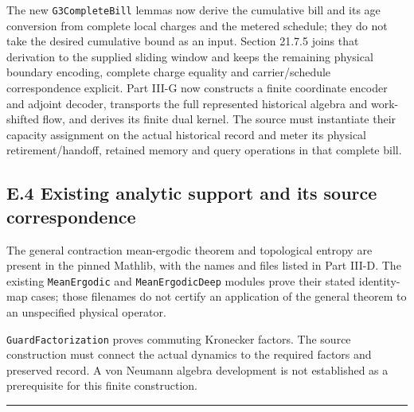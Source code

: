 \documentclass[
]{article}
\begin{document}
The new \texttt{G3CompleteBill} lemmas now derive the cumulative bill
and its age conversion from complete local charges and the metered
schedule; they do not take the desired cumulative bound as an input.
Section 21.7.5 joins that derivation to the supplied sliding window and
keeps the remaining physical boundary encoding, complete charge equality
and
c\allowbreak{}a\allowbreak{}r\allowbreak{}r\allowbreak{}i\allowbreak{}e\allowbreak{}r\allowbreak{}/\allowbreak{}s\allowbreak{}c\allowbreak{}h\allowbreak{}e\allowbreak{}d\allowbreak{}u\allowbreak{}l\allowbreak{}e
correspondence explicit. Part III-G now constructs a finite coordinate
encoder and adjoint decoder, transports the full represented historical
algebra and work-shifted flow, and derives its finite dual kernel. The
source must instantiate their capacity assignment on the actual
historical record and meter its physical
r\allowbreak{}e\allowbreak{}t\allowbreak{}i\allowbreak{}r\allowbreak{}e\allowbreak{}m\allowbreak{}e\allowbreak{}n\allowbreak{}t\allowbreak{}/\allowbreak{}h\allowbreak{}a\allowbreak{}n\allowbreak{}d\allowbreak{}o\allowbreak{}f\allowbreak{}f\allowbreak{},
retained memory and query operations in that complete bill.

\subsection{E.4 Existing analytic support and its source
correspondence}\label{e.4-existing-analytic-support-and-its-source-correspondence}

The general contraction mean-ergodic theorem and topological entropy are
present in the pinned Mathlib, with the names and files listed in Part
III-D. The existing \texttt{MeanErgodic} and \texttt{MeanErgodicDeep}
modules prove their stated identity-map cases; those filenames do not
certify an application of the general theorem to an unspecified physical
operator.

\texttt{G\allowbreak{}u\allowbreak{}a\allowbreak{}r\allowbreak{}d\allowbreak{}F\allowbreak{}a\allowbreak{}c\allowbreak{}t\allowbreak{}o\allowbreak{}r\allowbreak{}i\allowbreak{}z\allowbreak{}a\allowbreak{}t\allowbreak{}i\allowbreak{}o\allowbreak{}n}
proves commuting Kronecker factors. The source construction must connect
the actual dynamics to the required factors and preserved record. A von
Neumann algebra development is not established as a prerequisite for
this finite construction.

\begin{center}\rule{0.5\linewidth}{0.5pt}\end{center}
\end{document}
